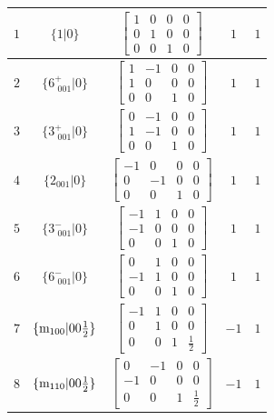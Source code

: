 \documentclass[fleqn,8pt]{jsarticle}
\begin{document}
\begin{longtable}{ccccc}
$ 1 $ & $ \{1|0\} $ & $ \begin{bmatrix} 1 & 0 & 0 & 0 \\ 0 & 1 & 0 & 0 \\ 0 & 0 & 1 & 0 \end{bmatrix} $ & $ 1 $ & $ 1 $ \\ \hline
$ 2 $ & $ \{6^{+}_{\,\,001}|0\} $ & $ \begin{bmatrix} 1 & -1 & 0 & 0 \\ 1 & 0 & 0 & 0 \\ 0 & 0 & 1 & 0 \end{bmatrix} $ & $ 1 $ & $ 1 $ \\ \hline
$ 3 $ & $ \{3^{+}_{\,\,001}|0\} $ & $ \begin{bmatrix} 0 & -1 & 0 & 0 \\ 1 & -1 & 0 & 0 \\ 0 & 0 & 1 & 0 \end{bmatrix} $ & $ 1 $ & $ 1 $ \\ \hline
$ 4 $ & $ \{2{}_{001}|0\} $ & $ \begin{bmatrix} -1 & 0 & 0 & 0 \\ 0 & -1 & 0 & 0 \\ 0 & 0 & 1 & 0 \end{bmatrix} $ & $ 1 $ & $ 1 $ \\ \hline
$ 5 $ & $ \{3^{-}_{\,\,001}|0\} $ & $ \begin{bmatrix} -1 & 1 & 0 & 0 \\ -1 & 0 & 0 & 0 \\ 0 & 0 & 1 & 0 \end{bmatrix} $ & $ 1 $ & $ 1 $ \\ \hline
$ 6 $ & $ \{6^{-}_{\,\,001}|0\} $ & $ \begin{bmatrix} 0 & 1 & 0 & 0 \\ -1 & 1 & 0 & 0 \\ 0 & 0 & 1 & 0 \end{bmatrix} $ & $ 1 $ & $ 1 $ \\ \hline
$ 7 $ & $ \{{\rm m}_{100}|0 0 \frac{1}{2}\} $ & $ \begin{bmatrix} -1 & 1 & 0 & 0 \\ 0 & 1 & 0 & 0 \\ 0 & 0 & 1 & \frac{1}{2} \end{bmatrix} $ & $ -1 $ & $ 1 $ \\ \hline
$ 8 $ & $ \{{\rm m}_{110}|0 0 \frac{1}{2}\} $ & $ \begin{bmatrix} 0 & -1 & 0 & 0 \\ -1 & 0 & 0 & 0 \\ 0 & 0 & 1 & \frac{1}{2} \end{bmatrix} $ & $ -1 $ & $ 1 $ \\ \hline

\end{longtable}
\end{document}
